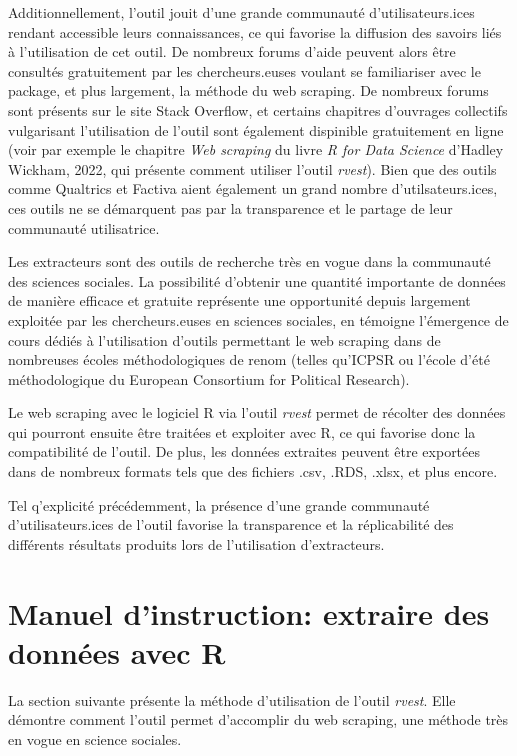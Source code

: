 \documentclass[
  letterpaper,
  DIV=11,
  numbers=noendperiod]{scrreprt}
\begin{document}
Additionnellement, l'outil jouit d'une grande communauté
d'utilisateurs.ices rendant accessible leurs connaissances, ce qui
favorise la diffusion des savoirs liés à l'utilisation de cet outil. De
nombreux forums d'aide peuvent alors être consultés gratuitement par les
chercheurs.euses voulant se familiariser avec le package, et plus
largement, la méthode du web scraping. De nombreux forums sont présents
sur le site Stack Overflow, et certains chapitres d'ouvrages collectifs
vulgarisant l'utilisation de l'outil sont également dispinible
gratuitement en ligne (voir par exemple le chapitre \emph{Web scraping}
du livre \emph{R for Data Science} d'Hadley Wickham, 2022, qui présente
comment utiliser l'outil \emph{rvest}). Bien que des outils comme
Qualtrics et Factiva aient également un grand nombre d'utilsateurs.ices,
ces outils ne se démarquent pas par la transparence et le partage de
leur communauté utilisatrice.

Les extracteurs sont des outils de recherche très en vogue dans la
communauté des sciences sociales. La possibilité d'obtenir une quantité
importante de données de manière efficace et gratuite représente une
opportunité depuis largement exploitée par les chercheurs.euses en
sciences sociales, en témoigne l'émergence de cours dédiés à
l'utilisation d'outils permettant le web scraping dans de nombreuses
écoles méthodologiques de renom (telles qu'ICPSR ou l'école d'été
méthodologique du European Consortium for Political Research).

Le web scraping avec le logiciel R via l'outil \emph{rvest} permet de
récolter des données qui pourront ensuite être traitées et exploiter
avec R, ce qui favorise donc la compatibilité de l'outil. De plus, les
données extraites peuvent être exportées dans de nombreux formats tels
que des fichiers .csv, .RDS, .xlsx, et plus encore.

Tel q'explicité précédemment, la présence d'une grande communauté
d'utilisateurs.ices de l'outil favorise la transparence et la
réplicabilité des différents résultats produits lors de l'utilisation
d'extracteurs.

\hypertarget{manuel-dinstruction-extraire-des-donnuxe9es-avec-r}{%
\section{Manuel d'instruction: extraire des données avec
R}\label{manuel-dinstruction-extraire-des-donnuxe9es-avec-r}}

La section suivante présente la méthode d'utilisation de l'outil
\emph{rvest}. Elle démontre comment l'outil permet d'accomplir du web
scraping, une méthode très en vogue en science sociales.
\end{document}
